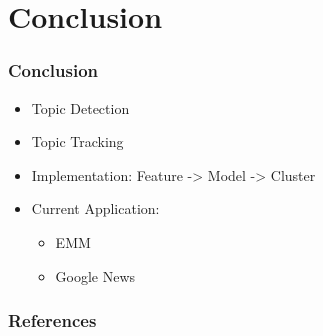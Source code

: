 \documentclass{beamer}
\begin{document}
\section{Conclusion}
\begin{frame}
	\frametitle{Conclusion}
	\begin{itemize}
		\item Topic Detection
		\item Topic Tracking
		\item Implementation: Feature -> Model -> Cluster
		\item Current Application:
			\begin{itemize}
				\item EMM
				\item Google News
			\end{itemize}
	\end{itemize}
\end{frame}

\begin{frame}
  \frametitle{References}
  \footnotesize{
    
    
  }

\end{frame}
\end{document}
